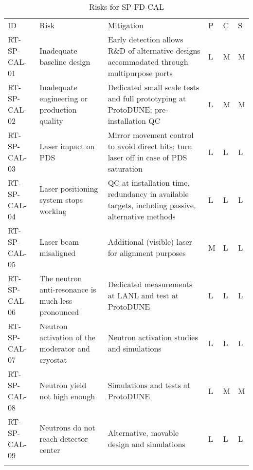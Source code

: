 
\begin{longtable}{p{}p{}p{}p{}p{}p{}} 
\caption{Risks for SP-FD-CAL } \\
\rowcolor{dunesky}
ID & Risk & Mitigation & P & C & S  \\  \colhline
RT-SP-CAL-01 & Inadequate baseline design & Early detection allows R\&D of alternative designs accommodated through multipurpose ports & L & M & M \\  \colhline
RT-SP-CAL-02 & Inadequate engineering or production quality & Dedicated small scale tests and full prototyping at ProtoDUNE; pre-installation QC & L & M & M \\  \colhline
RT-SP-CAL-03 & Laser impact on PDS & Mirror movement control to avoid direct hits; turn laser off in case of PDS saturation & L & L & L \\  \colhline
RT-SP-CAL-04 & Laser positioning system stops working & QC at installation time, redundancy in available targets, including passive, alternative methods & L & L & L \\  \colhline
RT-SP-CAL-05 & Laser beam misaligned & Additional (visible) laser for alignment purposes & M & L & L \\  \colhline
RT-SP-CAL-06 & The neutron anti-resonance is much less pronounced & Dedicated measurements at LANL and test at ProtoDUNE & L & L & L \\  \colhline
RT-SP-CAL-07 & Neutron activation of the moderator and cryostat & Neutron activation studies and simulations & L & L & L \\  \colhline
RT-SP-CAL-08 & Neutron yield not high enough & Simulations and tests at ProtoDUNE & L & M & M \\  \colhline
RT-SP-CAL-09 & Neutrons do not reach detector center & Alternative, movable design and simulations & L & L & L \\  \colhline

\label{tab:risks:SP-FD-CAL}
\end{longtable}